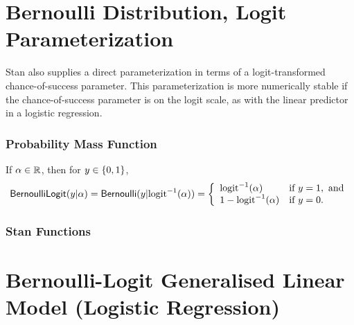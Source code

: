 \section{Bernoulli Distribution, Logit Parameterization}\label{bernoulli-logit-distribution.section}

Stan also supplies a direct parameterization in terms of a
logit-transformed chance-of-success parameter.  This parameterization
is more numerically stable if the chance-of-success parameter is on
the logit scale, as with the linear predictor in a logistic
regression.

\subsubsection{Probability Mass Function}

If $\alpha \in \mathbb{R}$, then for $y \in \{ 0,1 \}$,
\[
\mbox{\sf BernoulliLogit}(y|\alpha)
=
\mbox{\sf Bernoulli}(y|\mbox{logit}^{-1}(\alpha))
=
\left\{
\begin{array}{ll}
\mbox{logit}^{-1}(\alpha) & \mbox{if } y = 1, \mbox{ and}
\\
1 - \mbox{logit}^{-1}(\alpha) & \mbox{if } y = 0.
\end{array}
\right.
\]


\subsubsection{Stan Functions}

\begin{description}
%
%
\end{description}
%
\begin{description}
\end{description}

\section{Bernoulli-Logit Generalised Linear Model (Logistic Regression)}
\label{bernoulli-logit-glm.section}

